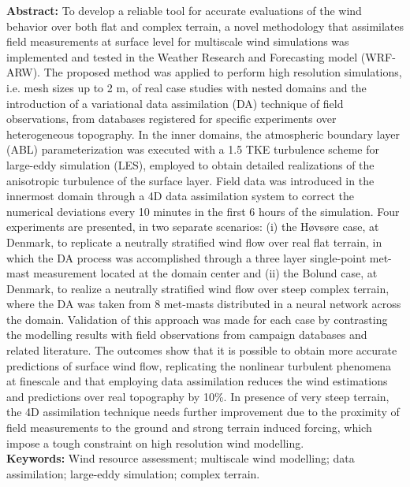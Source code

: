 \textbf{Abstract:}
To develop a reliable tool for accurate evaluations of the wind behavior over both flat and complex terrain, a novel methodology that assimilates field measurements at surface level for multiscale wind simulations was implemented and tested in the Weather Research and Forecasting model (WRF-ARW). The proposed method was applied to perform high resolution simulations, i.e. mesh sizes up to 2 m, of real case studies with nested domains and the introduction of a variational data assimilation (DA) technique of field observations, from databases registered for specific experiments over heterogeneous topography. In the inner domains, the atmospheric boundary layer (ABL) parameterization was executed with a 1.5 TKE turbulence scheme for large-eddy simulation (LES), employed to obtain detailed realizations of the anisotropic turbulence of the surface layer. 
Field data was introduced in the innermost domain through a 4D data assimilation system to correct the numerical deviations every 10 minutes in the first 6 hours of the simulation. Four experiments are presented, in two separate scenarios: (i) the Høvsøre case, at Denmark, to replicate a neutrally stratified wind flow over real flat terrain, in which the DA process was accomplished through a three layer single-point met-mast measurement located at the domain center and (ii) the Bolund case, at Denmark, to realize a neutrally stratified wind flow over steep complex terrain, where the DA was taken from 8 met-masts distributed in a neural network across the domain. 
Validation of this approach was made for each case by contrasting the modelling results with field observations from campaign databases and related literature. The outcomes show that it is possible to obtain more accurate predictions of surface wind flow, replicating the nonlinear turbulent phenomena at finescale and that employing data assimilation reduces the wind estimations and predictions over real topography by 10\%. In presence of very steep terrain, the 4D assimilation technique needs further improvement due to the proximity of field measurements to the ground and strong terrain induced forcing, which impose a tough constraint on high resolution wind modelling.\\
\textbf{Keywords:} Wind resource assessment; multiscale wind modelling; data assimilation; large-eddy simulation; complex terrain.